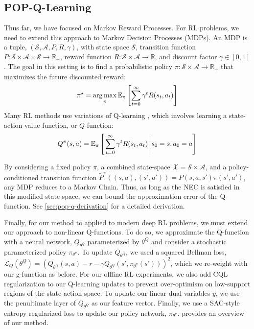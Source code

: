 \subsection{POP-Q-Learning}\label{sec:popq}\label{sec:pop-q-derivation}

Thus far, we have focused on Markov Reward Processes.
For RL problems, we need to extend this approach to Markov Decision Processes (MDPs).
An MDP is a tuple, $(\mathcal{S}, \mathcal{A}, P, R, \gamma)$, with state space $\mathcal S$, transition function $P : \mathcal{S} \times \mathcal{A} \times \mathcal{S} \to \mathbb{R}_+$, reward function $R : \mathcal S \times \mathcal{A} \to \mathbb R$, and discount factor $\gamma \in [0, 1]$.
The goal in this setting is to find a probabilistic policy $\pi : \mathcal{S} \times \mathcal{A} \to \mathbb{R}_+$ that maximizes the future discounted reward:
\begin{equation}
  \pi^\star = \operatorname*{arg\,max}_\pi \mathbb{E}_\pi \left [ \sum_{t=0}^\infty \gamma^t R(s_t, a_t) \right ]
\end{equation}
Many RL methods use variations of Q-learning \cite{watkins1992q,mnih2015humanlevel,haarnoja2018soft,kumar2020cql}, which involves learning a state-action value function, or $Q$-function:
\begin{equation}
  Q^\pi(s, a) = \mathbb{E}_\pi \left[\left.\sum_{t=0}^\infty \gamma^t R(s_t, a_t) \right| s_0 = s, a_0 = a \right]
\end{equation}

By considering a fixed policy $\pi$, a combined state-space $\mathcal{X} = \mathcal{S} \times \mathcal{A}$, and a policy-conditioned transition function $\tilde{P}^\pi((s, a), (s', a')) = P(s, a, s') \pi(s', a')$, any MDP reduces to a Markov Chain.
Thus, as long as the NEC is satisfied in this modified state-space, we can bound the approximation error of the Q-function.
See \cref{sec:pop-q-derivation} for a detailed derivation.

Finally, for our method to applied to modern deep RL problems, we must extend our approach to non-linear Q-functions.
To do so, we approximate the Q-function with a neural network, $Q_{\theta^Q}$ parameterized by $\theta^Q$ and consider a stochastic parameterized policy $\pi_{\theta^\pi}$.
To update $Q_{\theta^Q}$, we used a squared Bellman loss, $\mathcal{L}_Q(\theta^Q) = (Q_{\theta^Q}(s, a) - r - \gamma Q_{\theta^Q}(s', \pi_{\theta^\pi}(s')))^2$, which we re-weight with our g-function as before.
For our offline RL experiments, we also add CQL regularization \citep{kumar2020cql} to our Q-learning updates to prevent over-optimism on low-support regions of the state-action space.
To update our linear dual variables $y$, we use the penultimate layer of $Q_{\theta^Q}$ as our feature vector.
Finally, we use a SAC-style entropy regularized loss to update our policy network, $\pi_{\theta^\pi}$.
 provides an overview of our method.


